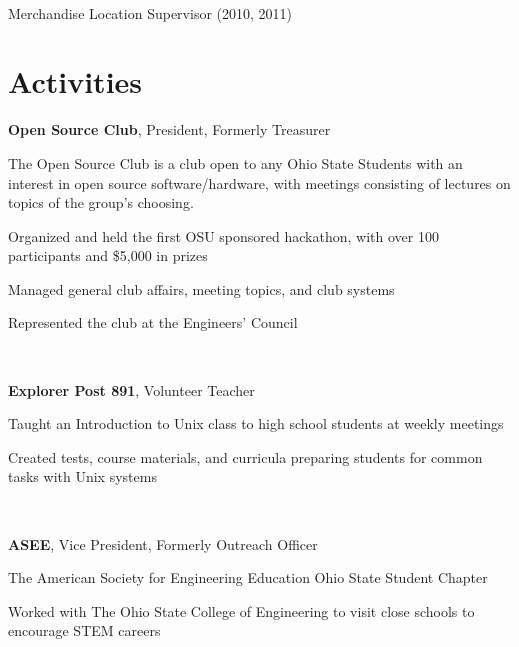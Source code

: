 \documentclass[letterpaper]{resume}
\begin{document}
~

Merchandise Location Supervisor (2010, 2011)

%

\section{Activities}

\textbf{Open Source Club}, President, Formerly Treasurer
\begin{compactitem}
\item The Open Source Club is a club open to any Ohio State Students with an interest in open source software/hardware, with meetings consisting of lectures on topics of the group's choosing.
\item Organized and held the first OSU sponsored hackathon, with over 100 participants and \$5,000 in prizes
\item Managed general club affairs, meeting topics, and club systems
\item Represented the club at the Engineers' Council
\end{compactitem}

~

\textbf{Explorer Post 891}, Volunteer Teacher
\begin{compactitem}
\item Taught an Introduction to Unix class to high school students at
	weekly meetings
\item Created tests, course materials, and curricula preparing students
	for common tasks with Unix systems
\end{compactitem}

~

\textbf{ASEE}, Vice President, Formerly Outreach Officer
\begin{compactitem}
\item The American Society for Engineering Education Ohio State Student Chapter
\item Worked with The Ohio State College of Engineering to visit close schools to encourage STEM careers
\end{compactitem}
\end{document}
